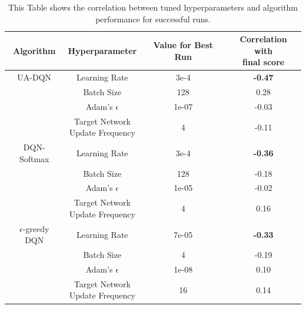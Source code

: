 \begin{table}[h]
  \centering
  \caption{This Table shows the correlation between tuned hyperparameters and algorithm performance for successful runs.}
  \label{tab:hyperparameters}
  \begin{tabular}{c||c|c|c}
    Algorithm & Hyperparameter & Value for Best Run & \makecell{Correlation with \\ final score} \\ \hline
    UA-DQN & Learning Rate                                & 3e-4 & \bf{-0.47}\\
           & Batch Size                                   & 128 &  0.28\\
           & Adam's $\epsilon$                            & 1e-07 & -0.03\\
           & \makecell{Target Network \\ Update Frequency}& 4 & -0.11\\ \hline
    DQN-Softmax & Learning Rate                                 & 3e-4 & \bf{-0.36} \\
                & Batch Size                                    & 128 & -0.18\\
                & Adam's $\epsilon$                             & 1e-05 & -0.02\\
                & \makecell{Target Network \\ Update Frequency} & 4 &  0.16\\ \hline
    $\epsilon$-greedy DQN & Learning Rate                       & 7e-05 & \bf{-0.33}\\
                & Batch Size                                    & 4 & -0.19\\
                & Adam's $\epsilon$                             & 1e-08 &  0.10\\
                & \makecell{Target Network \\ Update Frequency} & 16 &  0.14

  \end{tabular}
\end{table}



